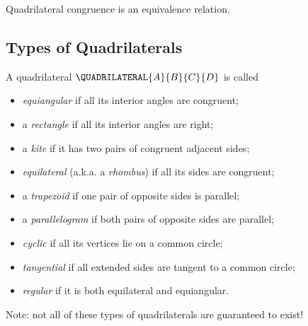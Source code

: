 \begin{prop}
Quadrilateral congruence is an equivalence relation.
\end{prop}

\subsection*{Types of Quadrilaterals}

\begin{dfn}
A quadrilateral \(\QUADRILATERAL{A}{B}{C}{D}\) is called
\begin{itemize}
\item \emph{equiangular} if all its interior angles are congruent;
\item a \emph{rectangle} if all its interior angles are right;
\item a \emph{kite} if it has two pairs of congruent adjacent sides;
\item \emph{equilateral} (a.k.a. a \emph{rhombus}) if all its sides are congruent;
\item a \emph{trapezoid} if one pair of opposite sides is parallel;
\item a \emph{parallelogram} if both pairs of opposite sides are parallel;
\item \emph{cyclic} if all its vertices lie on a common circle;
\item \emph{tangential} if all extended sides are tangent to a common circle;
\item \emph{regular} if it is both equilateral and equiangular.
\end{itemize}
\end{dfn}

Note: not all of these types of quadrilaterals are guaranteed to exist!

